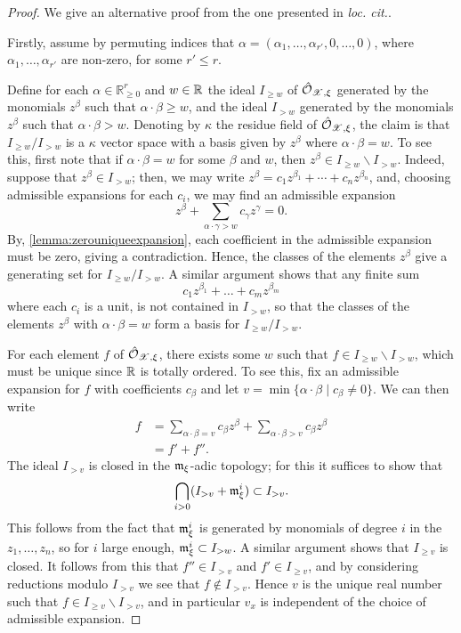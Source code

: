 \begin{proof}
    We give an alternative proof from the one presented in \textit{loc. cit.}.

Firstly, assume by permuting indices that $\alpha = (\alpha_1, \dots, \alpha_{r'}, 0, \dots, 0)$, where $\alpha_1, \dots, \alpha_{r'}$ are non-zero, for some $r' \leq r$.

Define for each $\alpha \in \mathbb{R}^r_{\geq 0}$ and $w \in \mathbb{R}$ the ideal $I_{\geq w}$ of $\hat{\mathcal{O}}_{\mathscr{X}, \xi}$ generated by the monomials $z^{\beta}$ such that $\alpha \cdot \beta \geq w$, and the ideal $I_{> w}$ generated by the monomials $z^{\beta}$ such that $\alpha \cdot \beta > w$.
Denoting by $\kappa$ the residue field of $\hat{\mathcal{O}}_{\mathscr{X}, \xi}$, the claim is that $I_{\geq w} / I_{> w}$ is a $\kappa$ vector space with a basis given by $z^{\beta}$ where $\alpha \cdot \beta = w$.
To see this, first note that if $\alpha \cdot \beta = w$ for some $\beta$ and $w$, then $z^{\beta} \in I_{\geq w} \backslash I_{> w}$.
Indeed, suppose that $z^{\beta} \in I_{> w}$; then, we may write $z^{\beta} = c_1 z^{\beta_1} + \cdots + c_n z^{\beta_n}$, and, choosing admissible expansions for each $c_i$, we may find an admissible expansion
\[
    z^{\beta} + \sum_{\alpha \cdot \gamma > w} c_{\gamma} z^{\gamma} = 0.
\]
By, \cref{lemma:zerouniqueexpansion}, each coefficient in the admissible expansion must be zero, giving a contradiction.
Hence, the classes of the elements $z^{\beta}$ give a generating set for $I_{\geq w} / I_{> w}$.
A similar argument shows that any finite sum \[ c_1 z^{\beta_1} + \dots + c_m z^{\beta_m} \] where each $c_i$ is a unit, is not contained in $I_{> w}$, so that the classes of the elements $z^{\beta}$ with $\alpha \cdot \beta = w$ form a basis for $I_{\geq w}/I_{> w}$.

For each element $f$ of $\hat{\mathcal{O}}_{\mathscr{X}, \xi}$, there exists some $w$ such that $f \in I_{\geq w} \backslash I_{> w}$, which must be unique since $\mathbb{R}$ is totally ordered.
To see this, fix an admissible expansion for $f$ with coefficients $c_{\beta}$ and let $v = \min \{ \alpha \cdot \beta \; | \; c_{\beta} \neq 0 \}$. 
We can then write
\begin{align*}
    f & = \sum_{\alpha \cdot \beta = v} c_{\beta} z^{\beta} + \sum_{\alpha \cdot \beta > v} c_{\beta} z^{\beta} \\
    & = f' + f''.
\end{align*}
The ideal $I_{> v}$ is closed in the $\mathfrak{m}_{\xi}$-adic topology; for this it suffices to show that
\[
    \bigcap_{i > 0} (I_{> v} + \mathfrak{m}_{\xi}^{i}) \subset I_{> v}.
\]
This follows from the fact that $\mathfrak{m}^{i}_{\xi}$ is generated by monomials of degree $i$ in the $z_1, \dots, z_n$, so  for $i$ large enough, $\mathfrak{m}^{i}_{\xi} \subset I_{> w}$.
A similar argument shows that $I_{\geq v}$ is closed.
It follows from this that $f'' \in I_{> v}$ and $f' \in I_{\geq v}$, and by considering reductions modulo $I_{> v}$ we see that $f \not\in I_{> v}$.
Hence $v$ is the unique real number such that $f \in I_{\geq v} \backslash I_{> v}$, and in particular $v_x$ is independent of the choice of admissible expansion.


\end{proof}

